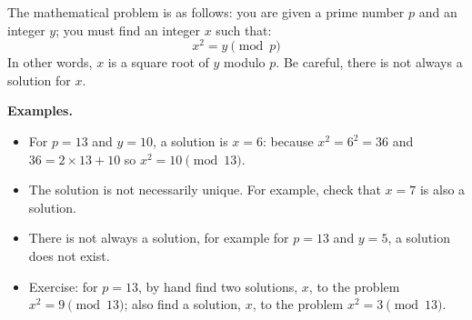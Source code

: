 \documentclass[11pt,class=report,crop=false]{standalone}
\begin{document}





\begin{activite}



The mathematical problem is as follows: you are given a prime number $p$ and an integer $y$; you must find an integer $x$ such that:
$$x^2 = y \pmod{p}$$
In other words, $x$ is a square root of $y$ modulo $p$.
Be careful, there is not always a solution for $x$. 

\textbf{Examples.}
\begin{itemize}
  \item For $p=13$ and $y = 10$, a solution is $x = 6$: because $x^2 = 6^2 = 36$ and $36 = 2\times 13 + 10$ so $x^2 = 10 \pmod{13}$.
  
  \item The solution is not necessarily unique. For example, check that $x=7$ is also a solution.
  
  \item There is not always a solution, for example for $p=13$ and $y=5$, a solution does not exist.
  
  \item Exercise: for $p = 13$, by hand find two solutions, $x$, to the problem $x^2 = 9 \pmod{13}$; also find a solution, $x$, to the problem $x^2 = 3 \pmod{13}$.
  
\end{itemize}



\end{activite}
\end{document}
